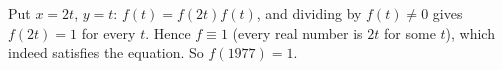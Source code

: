 Put $x=2t$, $y=t$: $f(t)=f(2t)f(t)$, and dividing by $f(t)\ne0$ gives $f(2t)=1$ for every $t$. Hence $f\equiv1$ (every real number is $2t$ for some $t$), which indeed satisfies the equation. So $f(1977)=\boxed{1}$.
